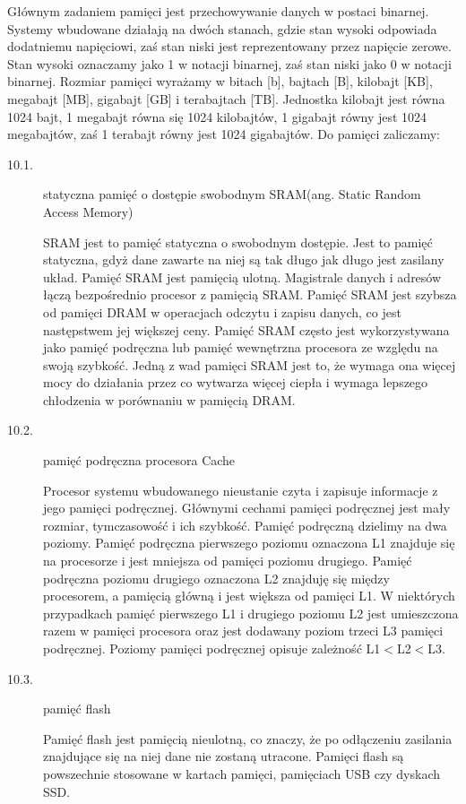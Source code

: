 \documentclass[12p]{article}
\begin{document}
Głównym zadaniem pamięci jest przechowywanie danych w postaci binarnej. Systemy wbudowane działają na dwóch stanach, gdzie stan wysoki odpowiada dodatniemu napięciowi, zaś stan niski jest reprezentowany przez napięcie zerowe. Stan wysoki oznaczamy jako 1 w notacji binarnej, zaś stan niski jako 0 w notacji binarnej. Rozmiar pamięci wyrażamy w bitach [b], bajtach [B], kilobajt [KB], megabajt [MB], gigabajt [GB] i terabajtach [TB]. Jednostka kilobajt jest równa 1024 bajt, 1 megabajt równa się 1024 kilobajtów, 1 gigabajt równy jest 1024 megabajtów, zaś 1 terabajt równy jest 1024 gigabajtów. Do pamięci zaliczamy:
\begin{description}

\item[10.1. ]statyczna pamięć o dostępie swobodnym SRAM(ang. Static Random Access Memory)

SRAM jest to pamięć statyczna o swobodnym dostępie. Jest to pamięć statyczna, gdyż dane zawarte na niej są tak długo jak długo jest zasilany układ. Pamięć SRAM jest pamięcią ulotną. Magistrale danych i adresów łączą bezpośrednio procesor z pamięcią SRAM. Pamięć SRAM jest szybsza od pamięci DRAM w operacjach odczytu i zapisu danych, co jest następstwem jej większej ceny. Pamięć SRAM często jest wykorzystywana jako pamięć podręczna lub pamięć wewnętrzna procesora ze względu na swoją szybkość. Jedną z wad pamięci SRAM jest to, że wymaga ona więcej mocy do działania przez co wytwarza więcej ciepła i wymaga lepszego chłodzenia w porównaniu w pamięcią DRAM. %

\item[10.2. ]pamięć podręczna procesora Cache

Procesor systemu wbudowanego nieustanie czyta i zapisuje informacje z jego pamięci podręcznej. Głównymi cechami pamięci podręcznej jest mały rozmiar, tymczasowość i ich szybkość. Pamięć podręczną dzielimy na dwa poziomy. Pamięć podręczna pierwszego poziomu oznaczona L1 znajduje się na procesorze i jest mniejsza od pamięci poziomu drugiego. Pamięć podręczna poziomu drugiego oznaczona L2 znajduję się między procesorem, a pamięcią główną i jest większa od pamięci L1. W niektórych przypadkach pamięć pierwszego L1 i drugiego poziomu L2 jest umieszczona razem w pamięci procesora oraz jest dodawany poziom trzeci L3 pamięci podręcznej. Poziomy pamięci podręcznej opisuje zależność L1$<$L2$<$L3. 

\item[10.3. ]pamięć flash

Pamięć flash jest pamięcią nieulotną, co znaczy, że po odłączeniu zasilania znajdujące się na niej dane nie zostaną utracone. Pamięci flash są powszechnie stosowane w kartach pamięci, pamięciach USB czy dyskach SSD.
\end{description}
\end{document}
